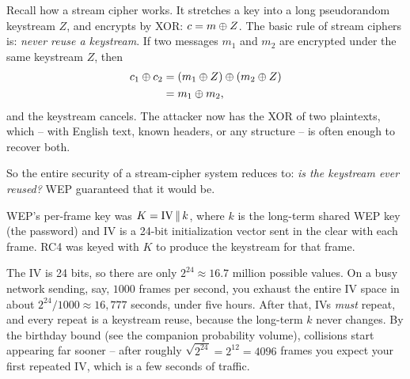 Recall how a stream cipher works. It stretches a key into a long pseudorandom
keystream $Z$, and encrypts by XOR: $c = m \oplus Z$. The basic rule of stream
ciphers is: \emph{never reuse a keystream}. If two
messages $m_1$ and $m_2$ are encrypted under the same keystream $Z$, then
\begin{align*}
  c_1 \oplus c_2 &= (m_1 \oplus Z) \oplus (m_2 \oplus Z) \\
               &= m_1 \oplus m_2,
\end{align*}
and the keystream cancels. The attacker now has the XOR of two plaintexts, which
-- with English text, known headers, or any structure -- is often enough to
recover both.

So the entire security of a stream-cipher system reduces to: \emph{is the
keystream ever reused?} WEP guaranteed that it would be.

\begin{whybox}
WEP's per-frame key was $K = \text{IV} \,\|\, k$, where $k$ is the long-term
shared WEP key (the password) and IV is a 24-bit initialization
vector sent in the clear with each frame. RC4 was keyed with $K$ to produce the
keystream for that frame.

The IV is 24 bits, so there are only $2^{24} \approx 16.7$ million possible
values. On a busy network sending, say, $1000$ frames per second, you exhaust the
entire IV space in about $2^{24}/1000 \approx 16{,}777$ seconds, under five
hours. After that, IVs \emph{must} repeat, and every repeat is a keystream reuse,
because the long-term $k$ never changes. By the birthday bound (see the companion
probability volume), collisions start appearing far sooner -- after roughly
$\sqrt{2^{24}} = 2^{12} = 4096$ frames you expect your first repeated IV, which is a few
seconds of traffic.
\end{whybox}

